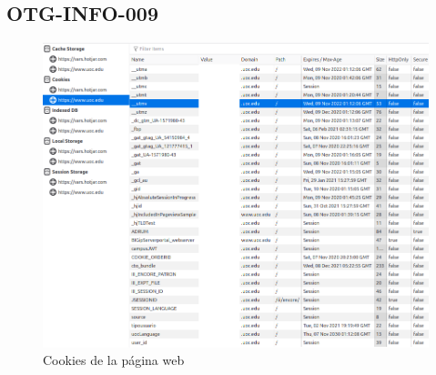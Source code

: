 \documentclass[10pt,a4paper]{article}
\begin{document}
\subsection{OTG-INFO-009}
\label{ann:otg-info-009}
\begin{figure}[h!]
  \centering
  \includegraphics[scale=0.3]{cookies.png}
  \caption{Cookies de la página web}
  \label{fig:otg-info-009}
\end{figure}

\pagebreak
\end{document}
